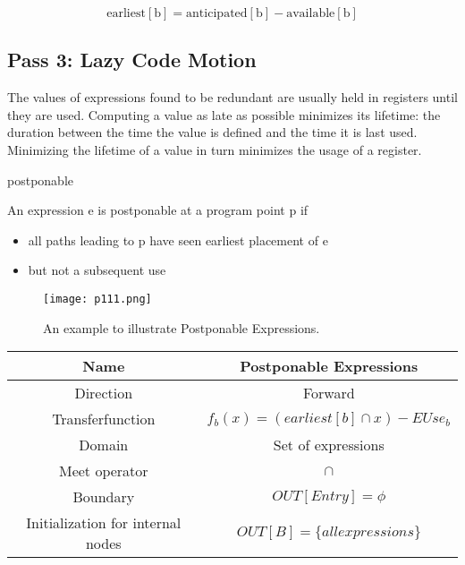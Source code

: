    \[
     \mathrm{earliest[b] = anticipated[b] - available[b]}
   \]


   \subsection{Pass 3: Lazy Code Motion}
The values of expressions found to be redundant are usually
held in registers until they are used. Computing a value as late as possible minimizes its lifetime:
the duration between the time the value is defined and the
time it is last used. Minimizing the lifetime of a value in turn minimizes the usage of
a register. 


\begin{definition}{postponable}

    An expression e is postponable at a program point p if
    \begin{itemize}
    \item all paths leading to p have seen earliest placement of e
    \item but not a subsequent use
    \end{itemize}

    \begin{figure}[H]
        \centering
         \texttt{[image: p111.png]}
             \caption{An example to illustrate Postponable Expressions.}
             \label{fig:p111}
    \end{figure}
\end{definition}




    \begin{center}
        \begin{tabular}{|c|c|}
       \hline Name & Postponable Expressions\\    
       \hline Direction & Forward\\
       \hline Transferfunction  & \( f_b (x) = (earliest[b] \cap x) - EUse_b \)\\
       \hline Domain & Set of expressions\\
       \hline Meet operator & \( \cap \)\\
       \hline Boundary & $OUT[Entry] = \phi$ \\  
       \hline Initialization for internal nodes & \( OUT[B] = \{ all expressions\} \) \\
       \hline
       \end{tabular}  
       \end{center}


